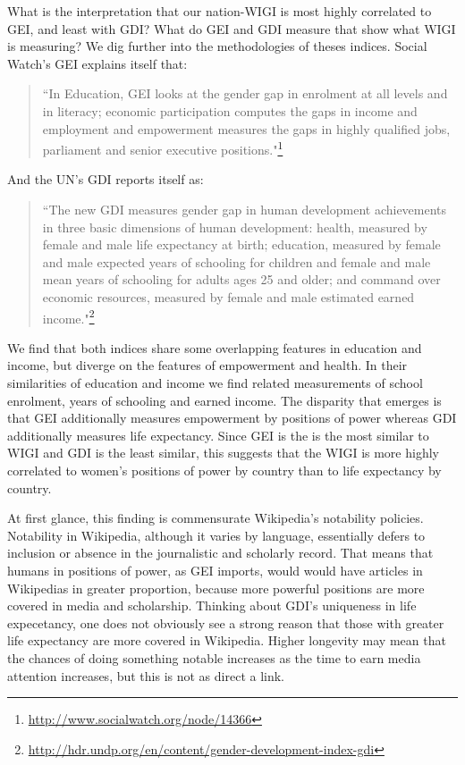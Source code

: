 \documentclass{sig-alternate}
\begin{document}
What is the interpretation that our nation-WIGI is most highly correlated to GEI, and least with GDI? What do GEI and GDI measure that show what WIGI is measuring? We dig further into the methodologies of theses indices. Social Watch's GEI explains itself that:

\begin{quote}
    ``In Education, GEI looks at the gender gap in enrolment at all levels and in literacy; economic participation computes the gaps in income and employment and empowerment measures the gaps in highly qualified jobs, parliament and senior executive positions."\footnote{\url{http://www.socialwatch.org/node/14366}}
\end{quote}

And the UN's GDI reports itself as:

\begin{quote}
   ``The new GDI measures gender gap in human development achievements in three basic dimensions of human development: health, measured by female and male life expectancy at birth; education, measured by female and male expected years of schooling for children and female and male mean years of schooling for adults ages 25 and older; and command over economic resources, measured by female and male estimated earned income."\footnote{\url{http://hdr.undp.org/en/content/gender-development-index-gdi}}
 \end{quote}

We find that both indices share some overlapping features in education and income, but diverge on the features of empowerment and health. 
In their similarities of education and income we find related measurements of school enrolment, years of schooling and earned income.
The disparity that emerges is that GEI additionally measures empowerment by positions of power whereas GDI additionally measures life expectancy. Since GEI is the is the most similar to WIGI and GDI is the least similar, this suggests that the WIGI is more highly correlated to women's positions of power by country than to life expectancy by country. 

At first glance, this finding is commensurate Wikipedia's notability policies. Notability in Wikipedia, although it varies by language, essentially defers to inclusion or absence in the journalistic and scholarly record. That means that humans in positions of power, as GEI imports, would would have articles in Wikipedias in greater proportion, because more powerful positions are more covered in media and scholarship. Thinking about GDI's uniqueness in life expecetancy, one does not obviously see a strong reason that those with greater life expectancy are more covered in Wikipedia. Higher longevity may mean that the chances of doing something notable increases as the time to earn media attention increases, but this is not as direct a link. 
\end{document}
